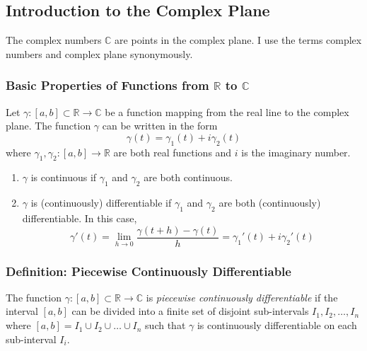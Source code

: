\documentclass[11pt, a4paper]{article}
\newcommand{\R}{\mathbb{R}} %
\newcommand{\C}{\mathbb{C}} %
\begin{document}
\subsection{Introduction to the Complex Plane}

The complex numbers $ \C $ are points in the complex plane. I use the terms complex numbers and complex plane synonymously.

\subsubsection{Basic Properties of Functions from $ \R $ to $ \C $}
Let $ \gamma : [a, b] \subset \R \to \C $ be a function mapping from the real line to the complex plane. The function $ \gamma $ can be written in the form
\begin{equation*}
	\gamma(t) = \gamma_1(t) + i \gamma_2(t)
\end{equation*}
where $ \gamma_1, \gamma_2 : [a, b] \to \R $ are both real functions and $ i $ is the imaginary number.

\begin{enumerate}
	\item $ \gamma $ is continuous if $ \gamma_1 $ and $ \gamma_2 $ are both continuous.
	\item $ \gamma $ is (continuously) differentiable if $ \gamma_1 $ and $ \gamma_2 $ are both (continuously) differentiable. In this case,
	\begin{equation*}
		\gamma'(t) = \lim_{h \to 0} \frac{\gamma(t + h) - \gamma(t)}{h} = \gamma_1'(t) + i \gamma_2'(t)
	\end{equation*}
\end{enumerate}

\subsubsection{Definition: Piecewise Continuously Differentiable}
The function $ \gamma : [a, b] \subset \R \to \C $ is \textit{piecewise continuously differentiable} if the interval $ [a, b] $ can be divided into a finite set of disjoint sub-intervals $ I_1, I_2, \dots, I_n $ where $ [a, b] = I_1 \cup  I_2 \cup \dots \cup I_n $ such that $ \gamma $ is continuously differentiable on each sub-interval $ I_i $.
\end{document}
